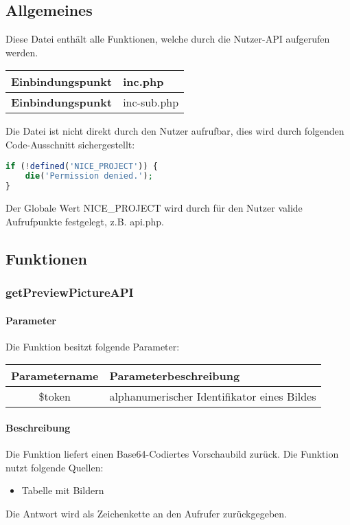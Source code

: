 \subsection{Allgemeines} Diese Datei enthält alle Funktionen, welche durch die Nutzer-API aufgerufen werden.
\begin{table}[H]
	\begin{tabular}{|c|p{11cm}|}
		\hline
		\textbf{Einbindungspunkt} & inc.php \\ \hline
		\textbf{Einbindungspunkt} & inc-sub.php \\ \hline
	\end{tabular}
\end{table}
Die Datei ist nicht direkt durch den Nutzer aufrufbar, dies wird durch folgenden Code-Ausschnitt sichergestellt:
\begin{lstlisting}[language=php]
if (!defined('NICE_PROJECT')) {
	die('Permission denied.');
}
\end{lstlisting}
Der Globale Wert {\glqq NICE\_PROJECT\grqq} wird durch für den Nutzer valide Aufrufpunkte festgelegt, z.B. {\glqq api.php\grqq}.
\newpage
\subsection{Funktionen}
\subsubsection{getPreviewPictureAPI}
\paragraph{Parameter} Die Funktion besitzt folgende Parameter:
\begin{table}[H]
	\begin{tabular}{|c|p{11cm}|}
		\hline
		\textbf{Parametername} & \textbf{Parameterbeschreibung} \\ \hline
		\$token & alphanumerischer Identifikator eines Bildes \\ \hline
	\end{tabular}
\end{table}
\paragraph{Beschreibung} Die Funktion liefert einen Base64-Codiertes Vorschaubild zurück. Die Funktion nutzt folgende Quellen:
\begin{itemize}
	\item Tabelle mit Bildern
\end{itemize}
Die Antwort wird als Zeichenkette an den Aufrufer zurückgegeben.
